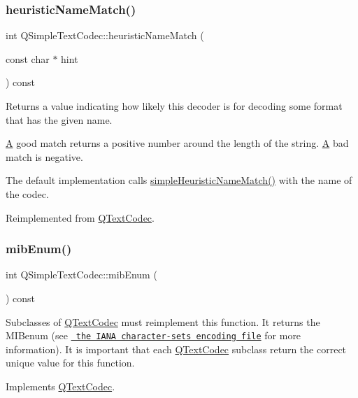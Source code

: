 \subsubsection{\texorpdfstring{heuristicNameMatch()}{heuristicNameMatch()}}
{\footnotesize\ttfamily int Q\+Simple\+Text\+Codec\+::heuristic\+Name\+Match (\begin{DoxyParamCaption}\item[{const char $\ast$}]{hint }\end{DoxyParamCaption}) const\hspace{0.3cm}{\ttfamily [virtual]}}

Returns a value indicating how likely this decoder is for decoding some format that has the given name.

\mbox{\hyperlink{class_a}{A}} good match returns a positive number around the length of the string. \mbox{\hyperlink{class_a}{A}} bad match is negative.

The default implementation calls \mbox{\hyperlink{class_q_text_codec_a16459bb8c9e7c502547f45e5387fbb03}{simple\+Heuristic\+Name\+Match()}} with the name of the codec. 

Reimplemented from \mbox{\hyperlink{class_q_text_codec_a1bcf2f11fac6113fd6ae74dda55b2ca4}{Q\+Text\+Codec}}.

\mbox{\label{class_q_simple_text_codec_aa1617c3384f129a43dfd0edc15177eaf}} 
\subsubsection{\texorpdfstring{mibEnum()}{mibEnum()}}
{\footnotesize\ttfamily int Q\+Simple\+Text\+Codec\+::mib\+Enum (\begin{DoxyParamCaption}{ }\end{DoxyParamCaption}) const\hspace{0.3cm}{\ttfamily [virtual]}}

Subclasses of \mbox{\hyperlink{class_q_text_codec}{Q\+Text\+Codec}} must reimplement this function. It returns the M\+I\+Benum (see \href{ftp://ftp.isi.edu/in-notes/iana/assignments/character-sets}{\texttt{ the I\+A\+NA character-\/sets encoding file}} for more information). It is important that each \mbox{\hyperlink{class_q_text_codec}{Q\+Text\+Codec}} subclass return the correct unique value for this function. 

Implements \mbox{\hyperlink{class_q_text_codec_aa0118daa4f82235ae9d5bb70a168c992}{Q\+Text\+Codec}}.

